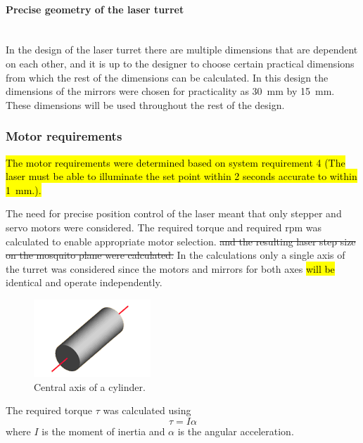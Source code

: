\paragraph{Precise geometry of the laser turret}\mbox{}\\
In the design of the laser turret there are multiple dimensions that are dependent on each other, and it is up to the designer to choose certain practical dimensions from which the rest of the dimensions can be calculated. In this design the dimensions of the mirrors were chosen for practicality as 30~mm by 15~mm. These dimensions will be used throughout the rest of the design.

\subsubsection{Motor requirements}
\hl{The motor requirements were determined based on system requirement 4 (The laser must be able to illuminate the set point within 2 seconds accurate to within 1~mm.).}

The need for precise position control of the laser meant that only stepper and servo motors were considered. The required torque and required \gls{rpm} was calculated to enable appropriate motor selection. \sout{and the resulting laser step size on the mosquito plane were calculated.} In the calculations only a single axis of the turret was considered since the motors and mirrors for both axes \hl{will be} identical and operate independently.

\begin{figure}
    \centering
    \includegraphics[scale=1]{figures/cylinder_central_axis.png}
    \caption{Central axis of a cylinder.}
    \label{fig:cylinder_central_axis}
\end{figure}

The required torque $\tau$ was calculated using
\begin{equation}
    \tau = I\alpha
    \label{eq:torque}
\end{equation}
where $I$ is the moment of inertia and $\alpha$ is the angular acceleration.

